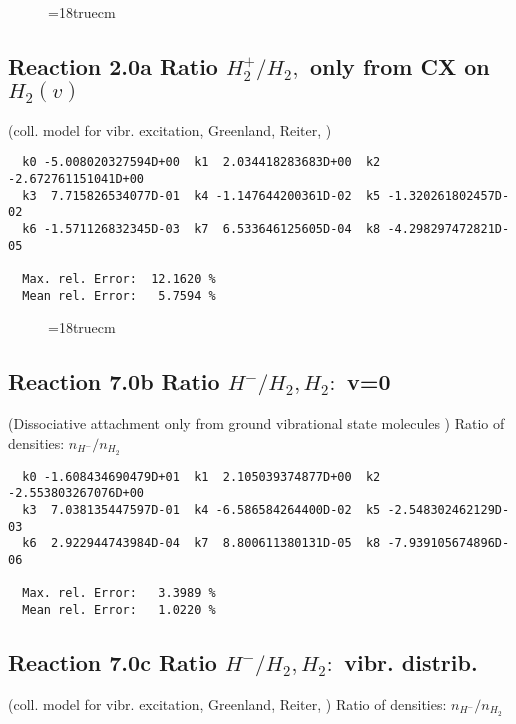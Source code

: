 \begin{figure} \label{2.18ll}
\epsfxsize=18truecm
\end{figure}
\newpage

\subsection{
Reaction 2.0a   Ratio $H_2^+/H_2,$ only from CX on $H_2(v)$
}
(coll. model for vibr. excitation, Greenland, Reiter, \cite{kn:Green})


\begin{verbatim}
  k0 -5.008020327594D+00  k1  2.034418283683D+00  k2 -2.672761151041D+00
  k3  7.715826534077D-01  k4 -1.147644200361D-02  k5 -1.320261802457D-02
  k6 -1.571126832345D-03  k7  6.533646125605D-04  k8 -4.298297472821D-05

  Max. rel. Error:  12.1620 %
  Mean rel. Error:   5.7594 %

\end{verbatim}

\begin{figure} \label{2.0a}
\epsfxsize=18truecm
\end{figure}

\newpage
\subsection{
Reaction 7.0b      Ratio $H^-/H_2, H_2: $ v=0
}


  (Dissociative attachment only from ground vibrational state
 molecules \cite{kn:Green})
  Ratio of densities: $n_{H^-}/n_{H_2}$

\begin{verbatim}
  k0 -1.608434690479D+01  k1  2.105039374877D+00  k2 -2.553803267076D+00
  k3  7.038135447597D-01  k4 -6.586584264400D-02  k5 -2.548302462129D-03
  k6  2.922944743984D-04  k7  8.800611380131D-05  k8 -7.939105674896D-06

  Max. rel. Error:   3.3989 %
  Mean rel. Error:   1.0220 %
\end{verbatim}

\subsection{
Reaction 7.0c      Ratio $H^-/H_2, H_2: $ vibr. distrib.
}


  (coll. model for vibr. excitation, Greenland, Reiter, \cite{kn:Green})
  Ratio of densities: $n_{H^-}/n_{H_2}$

